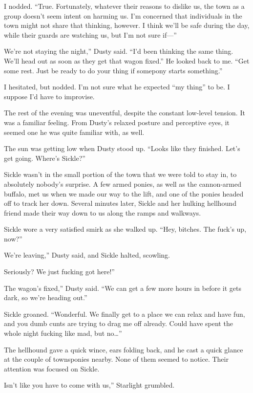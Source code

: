 I nodded. “True. Fortunately, whatever their reasons to dislike us, the town as a group doesn’t seem intent on harming us. I’m concerned that individuals in the town might not share that thinking, however. I think we’ll be safe during the day, while their guards are watching us, but I’m not sure if—”

\leavevmode{}We’re not staying the night,” Dusty said. “I’d been thinking the same thing. We’ll head out as soon as they get that wagon fixed.” He looked back to me. “Get some rest. Just be ready to do your thing if somepony starts something.”

I hesitated, but nodded. I’m not sure what he expected “my thing” to be. I suppose I’d have to improvise.

The rest of the evening was uneventful, despite the constant low-level tension. It was a familiar feeling. From Dusty’s relaxed posture and perceptive eyes, it seemed one he was quite familiar with, as well.

The sun was getting low when Dusty stood up. “Looks like they finished. Let’s get going. Where’s Sickle?”

Sickle wasn’t in the small portion of the town that we were told to stay in, to absolutely nobody’s surprise. A few armed ponies, as well as the cannon-armed buffalo, met us when we made our way to the lift, and one of the ponies headed off to track her down. Several minutes later, Sickle and her hulking hellhound friend made their way down to us along the ramps and walkways.

Sickle wore a very satisfied smirk as she walked up. “Hey, bitches. The fuck’s up, now?”

\leavevmode{}We’re leaving,” Dusty said, and Sickle halted, scowling.

\leavevmode{}Seriously? We just fucking got here!”

\leavevmode{}The wagon’s fixed,” Dusty said. “We can get a few more hours in before it gets dark, so we’re heading out.”

Sickle groaned. “Wonderful. We finally get to a place we can relax and have fun, and you dumb cunts are trying to drag me off already. Could have spent the whole night fucking like mad, but no…”

The hellhound gave a quick wince, ears folding back, and he cast a quick glance at the couple of townsponies nearby. None of them seemed to notice. Their attention was focused on Sickle.

\leavevmode{}Isn’t like you have to come with us,” Starlight grumbled.

